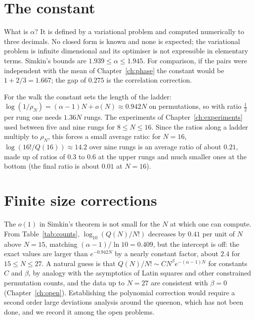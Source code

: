 \section{The constant}

What is $\alpha$? It is defined by a variational problem and computed numerically to three decimals. No closed form is known and none is expected; the variational problem is infinite dimensional and its optimiser is not expressible in elementary terms. Simkin's bounds are $1.939 \le \alpha \le 1.945$. For comparison, if the pairs were independent with the mean of Chapter~\ref{ch:phase} the constant would be $1 + 2/3 = 1.667$; the gap of $0.275$ is the correlation correction.

For the walk the constant sets the length of the ladder: $\log(1/\rho_N) = (\alpha - 1) N + o(N) \approx 0.942 N$ on permutations, so with ratio $\tfrac12$ per rung one needs $1.36 N$ rungs. The experiments of Chapter~\ref{ch:experiments} used between five and nine rungs for $8 \le N \le 16$. Since the ratios along a ladder multiply to $\rho_N$, this forces a small average ratio: for $N = 16$, $\log(16!/Q(16)) \approx 14.2$ over nine rungs is an average ratio of about $0.21$, made up of ratios of $0.3$ to $0.6$ at the upper rungs and much smaller ones at the bottom (the final ratio is about $0.01$ at $N = 16$).

\section{Finite size corrections}

The $o(1)$ in Simkin's theorem is not small for the $N$ at which one can compute. From Table~\ref{tab:counts}, $\log_{10}(Q(N)/N!)$ decreases by $0.41$ per unit of $N$ above $N = 15$, matching $(\alpha - 1)/\ln 10 = 0.409$, but the intercept is off: the exact values are larger than $e^{-0.942 N}$ by a nearly constant factor, about $2.4$ for $15 \le N \le 27$. A natural guess is that $Q(N) / N! \sim C N^{\beta} e^{-(\alpha - 1) N}$ for constants $C$ and $\beta$, by analogy with the asymptotics of Latin squares and other constrained permutation counts, and the data up to $N = 27$ are consistent with $\beta = 0$ (Chapter~\ref{ch:open}). Establishing the polynomial correction would require a second order large deviations analysis around the queenon, which has not been done, and we record it among the open problems.
